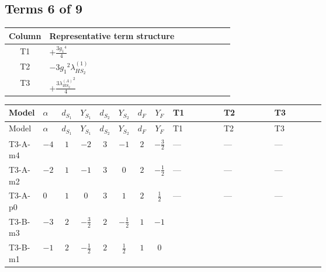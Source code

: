 \documentclass[8pt]{article}
\begin{document}
\begin{landscape}
\subsection*{Terms 6 of 9}
\begin{center}
\begin{tabular}{@{}c >{\raggedright\arraybackslash}p{0.82\linewidth}@{}}
\toprule
Column & Representative term structure \\
\midrule
T1 & \(\displaystyle +\frac{3 {g_1}^4}{4}\) \\
\midrule
T2 & \(\displaystyle -3 {g_1}^2 {\lambda_{HS_2}^{(1)}}\) \\
\midrule
T3 & \(\displaystyle +\frac{3 {\lambda_{HS_2}^{(A)}}^2}{4}\) \\
\midrule
\bottomrule
\end{tabular}
\end{center}
\smallskip
\tiny
\begin{longtable}{@{}llcccccc >{\raggedright\arraybackslash}p{0.21\linewidth} >{\raggedright\arraybackslash}p{0.21\linewidth} >{\raggedright\arraybackslash}p{0.21\linewidth}@{}}
\toprule
Model & $\alpha$ & $d_{S_1}$ & $Y_{S_1}$ & $d_{S_2}$ & $Y_{S_2}$ & $d_F$ & $Y_F$ & T1 & T2 & T3 \\
\midrule
\endfirsthead
\toprule
Model & $\alpha$ & $d_{S_1}$ & $Y_{S_1}$ & $d_{S_2}$ & $Y_{S_2}$ & $d_F$ & $Y_F$ & T1 & T2 & T3 \\
\midrule
\endhead
T3-A-m4 & $-4$ & $1$ & $-2$ & $3$ & $-1$ & $2$ & $-\frac{3}{2}$ & --- & --- & --- \\
\midrule
T3-A-m2 & $-2$ & $1$ & $-1$ & $3$ & $0$ & $2$ & $-\frac{1}{2}$ & --- & --- & --- \\
\midrule
T3-A-p0 & $0$ & $1$ & $0$ & $3$ & $1$ & $2$ & $\frac{1}{2}$ & --- & --- & --- \\
\midrule
T3-B-m3 & $-3$ & $2$ & $-\frac{3}{2}$ & $2$ & $-\frac{1}{2}$ & $1$ & $-1$ & \scriptsize\adjustbox{max width=\linewidth}{$\begin{gathered} +\frac{3 {g_1}^4}{4}\end{gathered}$} & \scriptsize\adjustbox{max width=\linewidth}{$\begin{gathered} -3 {g_1}^2 {\lambda_{HS_2}^{(1)}}\end{gathered}$} & \scriptsize\adjustbox{max width=\linewidth}{$\begin{gathered} +\frac{3 {\lambda_{HS_2}^{(A)}}^2}{4}\end{gathered}$} \\
\midrule
T3-B-m1 & $-1$ & $2$ & $-\frac{1}{2}$ & $2$ & $\frac{1}{2}$ & $1$ & $0$ & \scriptsize\adjustbox{max width=\linewidth}{$\begin{gathered} +\frac{3 {g_1}^4}{4}\end{gathered}$} & \scriptsize\adjustbox{max width=\linewidth}{$\begin{gathered} -3 {g_1}^2 {\lambda_{HS_2}^{(1)}}\end{gathered}$} & \scriptsize\adjustbox{max width=\linewidth}{$\begin{gathered} +\frac{3 {\lambda_{HS_2}^{(A)}}^2}{4}\end{gathered}$} \\

\end{longtable}
\end{landscape}
\end{document}
